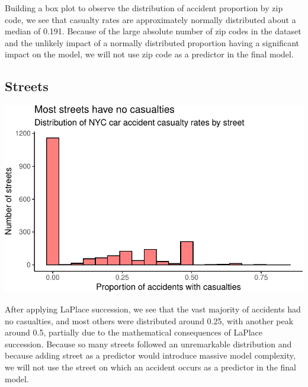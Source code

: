\documentclass[
  letterpaper,
  DIV=11,
  numbers=noendperiod]{scrartcl}
\begin{document}
Building a box plot to observe the distribution of accident proportion
by zip code, we see that casualty rates are approximately normally
distributed about a median of 0.191. Because of the large absolute
number of zip codes in the dataset and the unlikely impact of a normally
distributed proportion having a significant impact on the model, we will
not use zip code as a predictor in the final model.

\hypertarget{streets}{%
\subsection{Streets}\label{streets}}

\includegraphics{project_files/figure-pdf/viz-streets-hist-1.pdf}

After applying LaPlace succession, we see that the vast majority of
accidents had no casualties, and most others were distributed around
0.25, with another peak around 0.5, partially due to the mathematical
consequences of LaPlace succession. Because so many streets followed an
unremarkable distribution and because adding street as a predictor would
introduce massive model complexity, we will not use the street on which
an accident occurs as a predictor in the final model.

\newpage{}
\end{document}
